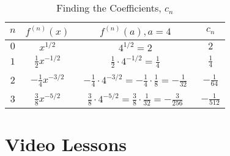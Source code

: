 \documentclass{ximera}
\begin{document}
\begin{example}
\begin{table}[ht]
\caption{Finding the Coefficients, $c_n$}
\centering
\begin{tabular}{|c|c|c|c|}
\hline
\raisebox{12pt}{\phantom{i}}\textbf{$n$} & \textbf{$f^{(n)}(x)$} & \textbf{$f^{(n)}(a), a = 4$} & \textbf{$c_n$} \\[1em]
\hline
\raisebox{12pt}{\phantom{i}}$0$ & $x^{1/2}$ &\raisebox{8pt}{\phantom{M}} $4^{1/2} = 2$ & $2$ \\[1em]
\hline
\raisebox{12pt}{\phantom{i}}$1$ & $\frac12 x^{-1/2}$ & \raisebox{8pt}{\phantom{M}}$\displaystyle{\frac12 \cdot 4^{-1/2} = \frac14}$ & $\frac14$ \\[1em]
\hline
\raisebox{12pt}{\phantom{i}} $2$ & \raisebox{12pt}{\phantom{i}}$-\frac14 x^{-3/2}$ & $\begin{aligned}-\frac14 \cdot 4^{-3/2} 
= -\frac14 \cdot \frac18 = -\frac{1}{32}\end{aligned}$ & $-\frac{1}{64}$ \\[1em]
\hline
\raisebox{12pt}{\phantom{i}} $3$ & $\frac38 x^{-5/2}$ & $\frac38 \cdot 4^{-5/2} = \frac38 \cdot \frac{1}{32} = -\frac{3}{256}$ & $-\frac{1}{512}$ \\[1em]
\hline
\end{tabular}
\end{table}










\end{example}

\section{Video Lessons}

\begin{center}
\begin{foldable}
\end{foldable}
\end{center}



\begin{center}
\begin{foldable}
\end{foldable}
\end{center}
\end{document}
